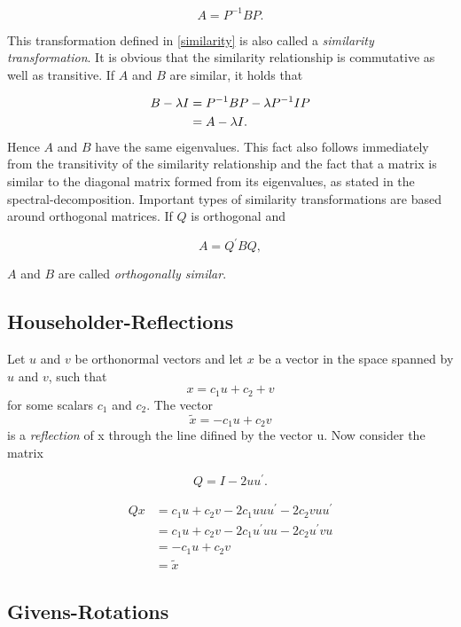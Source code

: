 \documentclass[12pt]{article}
\begin{document}
\begin{equation}
\label{similarity}
A = P^{-1} B P.
\end{equation}

This transformation defined in \ref{similarity} is also called a \textit{similarity transformation}. It is obvious that the similarity relationship is commutative as well as transitive. If $A$ and $B$ are similar, it holds that

\begin{align*}
B - \lambda I &= P^{-1} B P - \lambda P^{-1} I P \notag \\
              &= A - \lambda I.
\end{align*}
 Hence $A$ and $B$ have the same eigenvalues. This fact also follows immediately from the transitivity of the similarity relationship and the fact that a matrix is similar to the diagonal matrix formed from its eigenvalues, as stated in the spectral-decomposition. Important types of similarity transformations are based around orthogonal matrices. If $Q$ is orthogonal and
 
$$ A = Q^{\prime} B Q, $$

$A$ and $B$ are called \textit{orthogonally similar}.


\subsection{Householder-Reflections}

Let $u$ and $v$ be orthonormal vectors and let $x$ be a vector in the space spanned by $u$ and $v$, such that
$$x = c_1 u + c_2 + v$$ 
for some scalars $c_1$ and $c_2$. The vector 
$$\tilde{x}=-c_1 u + c_2 v$$ 
is a \textit{reflection} of x through the line difined by the vector u. Now consider the matrix

\begin{equation}
Q = I - 2 uu^{\prime}.
\end{equation}


\begin{align*}
Qx &= c_1 u + c_2 v - 2c_1 uuu^{\prime} - 2 c_2 v uu^{\prime} \\
   &= c_1 u + c_2 v - 2c_1 u^{\prime}uu - 2 c_2 u^{\prime} v u \\
   &= -c_1 u + c_2 v\\
   &= \tilde{x}
\end{align*}
\subsection{Givens-Rotations}
\end{document}
